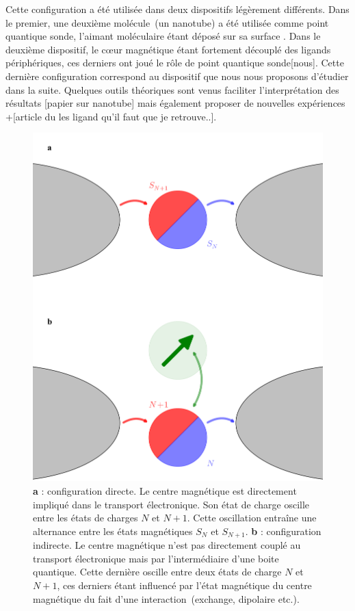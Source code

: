 Cette configuration a été utilisée dans deux dispositifs légèrement différents. Dans le premier, une deuxième molécule~(un nanotube) a été utilisée comme point quantique sonde, l'aimant moléculaire étant déposé sur sa surface \cite{Urdampilleta2011}. Dans le deuxième dispositif, le cœur magnétique étant fortement découplé des ligands périphériques, ces derniers ont joué le rôle de point quantique sonde[nous]. Cette dernière configuration correspond au dispositif que nous nous proposons d'étudier dans la suite. Quelques outils théoriques sont venus faciliter l'interprétation des résultats [papier sur nanotube] mais également proposer de nouvelles expériences~\cite{Jaafar2010} +[article du les ligand qu'il faut que je retrouve..].


\begin{figure}
\centering \includegraphics[scale=0.45]{Resultats/DirVsInd/DirVsInd.pdf} 
\caption{\textbf{a} : configuration directe. Le centre magnétique est directement impliqué dans le transport électronique. Son état de charge oscille entre les états de charges $N$ et $N+1$. Cette oscillation entraîne une alternance entre les états magnétiques $S_{N}$ et $S_{N+1}$. \textbf{b} : configuration indirecte. Le centre magnétique n'est pas directement couplé au transport électronique mais par l'intermédiaire d'une boite quantique. Cette dernière oscille entre deux états de charge $N$ et $N+1$, ces derniers étant influencé par l'état magnétique du centre magnétique du fait d'une interaction~(exchange, dipolaire etc.).}
\label{DirVsInd}
\end{figure}


